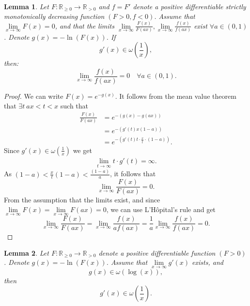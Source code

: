 \documentclass{article}
\newcommand{\R}{\mathbb{R}}
\newcommand{\ahard}{a}
\newcommand{\psn}{\R_{\ge 0}}
\newcommand{\prn}{\R_{> 0}}
\newtheorem{lemma}{Lemma}
\begin{document}
\begin{lemma}
\label{lemma:right_equal_0_region}
Let $F:\psn \rightarrow \prn$ and $f=F'$ denote a positive differentiable strictly monotonically decreasing function  $(F>0,f<0)$. Assume that $\lim\limits_{x\rightarrow\infty}F(x) =0$, and that the limits $\lim\limits_{x\rightarrow\infty}\frac{F(x)}{F(\ahard x)},\lim\limits_{x\rightarrow\infty}\frac{f(x)}{f(\ahard x)}$ exist $\forall \ahard\in(0,1)$. Denote $g(x)=-\ln\left(F(x)\right)$. If 
\begin{equation*}
g'(x)\in\omega\left(\frac{1}{x}\right),
\end{equation*}
then:
\begin{equation*}
\lim_{x\rightarrow\infty}\frac{f(x)}{f\left(\ahard x\right)}=0 \quad\forall \ahard\in(0,1).
\end{equation*}
\end{lemma}


\begin{proof}
We can write $F(x)=e^{-g(x)}$.
It follows from the mean value theorem that $\exists t~\ahard x < t < x$ such that
\begin{align*}
\frac{F(x)}{F(\ahard x)} &= e^{-(g(x)-g(\ahard x))} \\
&= e^{-(g'(t)x(1-\ahard))}\\
&= e^{-(g'(t)t\cdot\frac{x}{t}\cdot(1-\ahard))}.
\end{align*}
Since $g'(x)\in\omega\left(\frac{1}{x}\right)$ we get
\begin{align*}
\lim_{t\rightarrow\infty}t\cdot g'(t)=\infty.
\end{align*}
As $(1-a)<\frac{x}{t}(1-a)<\frac{(1-a)}{a}$, it follows that
\begin{equation*}
\lim_{x\rightarrow\infty}\frac{F(x)}{F(\ahard x)}=0.
\end{equation*}
From the assumption that the limits exist, and since $\lim\limits_{x\rightarrow\infty}F(x) =\lim\limits_{x\rightarrow\infty}F(\ahard x) =0$, we can use L'Hôpital's rule and get
\begin{equation*}
\lim_{x\rightarrow\infty}\frac{F(x)}{F(\ahard x)}=\lim_{x\rightarrow\infty}\frac{f(x)}{\ahard f(\ahard x)}=\frac{1}{a}\lim_{x\rightarrow\infty}\frac{f(x)}{f(\ahard x)}=0.
\end{equation*}
\end{proof}

\begin{lemma}
\label{lemma:bound_result_in_omega}
Let $F:\psn \rightarrow \prn$ denote a positive differentiable function $(F>0)$. Denote $g(x)=-\ln(F(x))$. Assume that
$\lim\limits_{x\to\infty}g'(x)$ exists, and
\begin{equation*}
g(x)\in\omega\left(\log(x)\right),
\end{equation*}
then
\begin{equation*}
g'(x)\in\omega\left(\frac{1}{x}\right).
\end{equation*}
\end{lemma}
\end{document}
